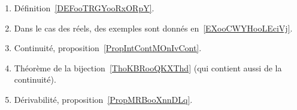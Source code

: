 
\begin{enumerate}
	\item
	      Définition~\ref{DEFooTRGYooRxORpY}.
	\item
	      Dans le cas des réels, des exemples sont donnés en~\ref{EXooCWYHooLEciVj}.
	\item
	      Continuité, proposition~\ref{PropIntContMOnIvCont}.
	\item
	      Théorème de la bijection~\ref{ThoKBRooQKXThd} (qui contient aussi de la continuité).
	\item
	      Dérivabilité, proposition~\ref{PropMRBooXnnDLq}.
\end{enumerate}

